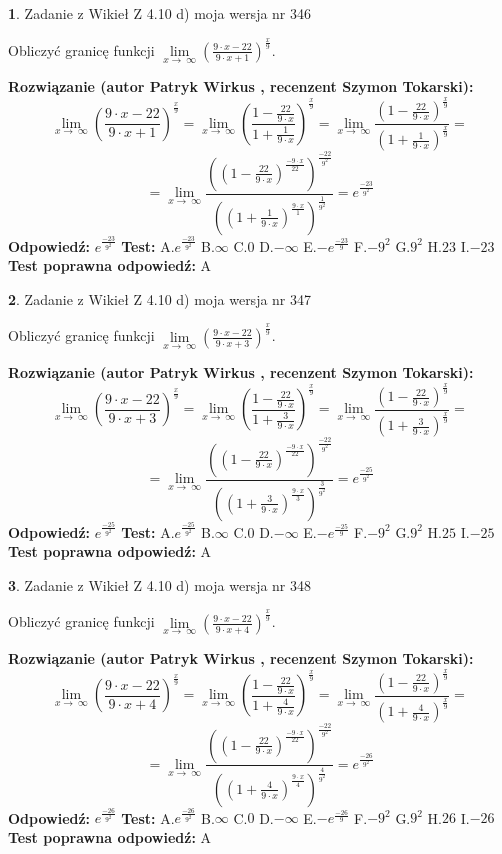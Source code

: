 \documentclass[12pt, a4paper]{article}
\theoremstyle{definition} %
\newtheorem{zad}{}
\newcommand{\zadStart}[1]{\begin{zad}#1\newline}
\newcommand{\zadStop}{\end{zad}}
\newcommand{\rozwStart}[2]{\noindent \textbf{Rozwiązanie (autor #1 , recenzent #2): }\newline}
\newcommand{\rozwStop}{\newline}
\newcommand{\odpStart}{\noindent \textbf{Odpowiedź:}\newline}
\newcommand{\odpStop}{\newline}
\newcommand{\testStart}{\noindent \textbf{Test:}\newline}
\newcommand{\testStop}{\newline}
\newcommand{\kluczStart}{\noindent \textbf{Test poprawna odpowiedź:}\newline}
\newcommand{\kluczStop}{\newline}
\begin{document}
\zadStart{Zadanie z Wikieł Z 4.10 d) moja wersja nr 346}


Obliczyć granicę funkcji  $\lim\limits_{x\to\ \infty}(\frac{9\cdot x-22}{9\cdot x+1})^{\frac{x}{9}}$.
\zadStop
\rozwStart{Patryk Wirkus}{Szymon Tokarski}
$$\lim\limits_{x\to\ \infty}(\frac{9\cdot x-22}{9\cdot x+1})^{\frac{x}{9}} = \lim\limits_{x\to\ \infty}(\frac{1-\frac{22}{9\cdot x}}{1+\frac{1}{9\cdot x}})^{\frac{x}{9}}=\lim\limits_{x\to\ \infty}\frac{(1-\frac{22}{9\cdot x})^{\frac{x}{9}}}{(1+\frac{1}{9\cdot x})^{\frac{x}{9}}}=$$
$$=\lim\limits_{x\to\ \infty}\frac{((1-\frac{22}{9\cdot x})^{\frac{-9\cdot x}{22}})^{\frac{-22}{9^{2}}}}{((1+\frac{1}{9\cdot x})^{\frac{9\cdot x}{1}})^{\frac{1}{9^{2}}}}=e^{\frac{-23}{9^{2}}}$$
\rozwStop
\odpStart
$e^{\frac{-23}{9^{2}}}$
\odpStop
\testStart
A.$e^{\frac{-23}{9^{2}}}$ B.$\infty$ C.$0$ D.$-\infty$ E.$-e^{\frac{-23}{9}}$
F.$-9^{2}$ G.$9^{2}$
H.$23$
I.$-23$
\testStop
\kluczStart
A
\kluczStop



\zadStart{Zadanie z Wikieł Z 4.10 d) moja wersja nr 347}


Obliczyć granicę funkcji  $\lim\limits_{x\to\ \infty}(\frac{9\cdot x-22}{9\cdot x+3})^{\frac{x}{9}}$.
\zadStop
\rozwStart{Patryk Wirkus}{Szymon Tokarski}
$$\lim\limits_{x\to\ \infty}(\frac{9\cdot x-22}{9\cdot x+3})^{\frac{x}{9}} = \lim\limits_{x\to\ \infty}(\frac{1-\frac{22}{9\cdot x}}{1+\frac{3}{9\cdot x}})^{\frac{x}{9}}=\lim\limits_{x\to\ \infty}\frac{(1-\frac{22}{9\cdot x})^{\frac{x}{9}}}{(1+\frac{3}{9\cdot x})^{\frac{x}{9}}}=$$
$$=\lim\limits_{x\to\ \infty}\frac{((1-\frac{22}{9\cdot x})^{\frac{-9\cdot x}{22}})^{\frac{-22}{9^{2}}}}{((1+\frac{3}{9\cdot x})^{\frac{9\cdot x}{3}})^{\frac{3}{9^{2}}}}=e^{\frac{-25}{9^{2}}}$$
\rozwStop
\odpStart
$e^{\frac{-25}{9^{2}}}$
\odpStop
\testStart
A.$e^{\frac{-25}{9^{2}}}$ B.$\infty$ C.$0$ D.$-\infty$ E.$-e^{\frac{-25}{9}}$
F.$-9^{2}$ G.$9^{2}$
H.$25$
I.$-25$
\testStop
\kluczStart
A
\kluczStop



\zadStart{Zadanie z Wikieł Z 4.10 d) moja wersja nr 348}


Obliczyć granicę funkcji  $\lim\limits_{x\to\ \infty}(\frac{9\cdot x-22}{9\cdot x+4})^{\frac{x}{9}}$.
\zadStop
\rozwStart{Patryk Wirkus}{Szymon Tokarski}
$$\lim\limits_{x\to\ \infty}(\frac{9\cdot x-22}{9\cdot x+4})^{\frac{x}{9}} = \lim\limits_{x\to\ \infty}(\frac{1-\frac{22}{9\cdot x}}{1+\frac{4}{9\cdot x}})^{\frac{x}{9}}=\lim\limits_{x\to\ \infty}\frac{(1-\frac{22}{9\cdot x})^{\frac{x}{9}}}{(1+\frac{4}{9\cdot x})^{\frac{x}{9}}}=$$
$$=\lim\limits_{x\to\ \infty}\frac{((1-\frac{22}{9\cdot x})^{\frac{-9\cdot x}{22}})^{\frac{-22}{9^{2}}}}{((1+\frac{4}{9\cdot x})^{\frac{9\cdot x}{4}})^{\frac{4}{9^{2}}}}=e^{\frac{-26}{9^{2}}}$$
\rozwStop
\odpStart
$e^{\frac{-26}{9^{2}}}$
\odpStop
\testStart
A.$e^{\frac{-26}{9^{2}}}$ B.$\infty$ C.$0$ D.$-\infty$ E.$-e^{\frac{-26}{9}}$
F.$-9^{2}$ G.$9^{2}$
H.$26$
I.$-26$
\testStop
\kluczStart
A
\kluczStop
\end{document}
